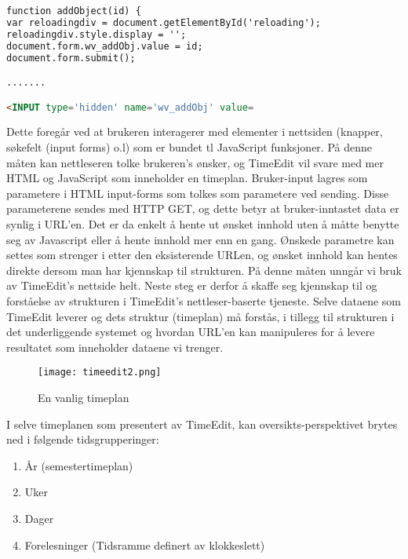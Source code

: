 \documentclass[../main.tex]{subfiles}
\begin{document}
\begin{lstlisting}[language=HTML, frame=single, caption={Utdraget av HTML kildekoden til TimeEdit ovenfor viser en JavaScript-funksjon og en input-tag.}]
function addObject(id) {
var reloadingdiv = document.getElementById('reloading');
reloadingdiv.style.display = '';
document.form.wv_addObj.value = id;
document.form.submit();

.......

<INPUT type='hidden' name='wv_addObj' value=
\end{lstlisting}

Dette foregår ved at brukeren interagerer med elementer i nettsiden (knapper, søkefelt (input forms) o.l) som er bundet tl JavaScript funksjoner. På denne måten kan nettleseren tolke brukeren's ønsker, og TimeEdit vil svare med mer HTML og JavaScript som inneholder en timeplan. Bruker-input lagres som parametere i HTML input-forms som tolkes som parametere ved sending. Disse parameterene sendes med HTTP GET, og dette betyr at bruker-inntastet data er synlig i URL'en. Det er da enkelt å hente ut ønsket innhold uten å måtte benytte seg av Javascript eller å hente innhold mer enn en gang. Ønskede parametre kan settes som strenger i etter den eksisterende URLen, og ønsket innhold kan hentes direkte dersom man har kjennskap til strukturen. På denne måten unngår vi bruk av TimeEdit's nettside helt. \newline
Neste steg er derfor å skaffe seg kjennskap til og forståelse av strukturen i TimeEdit's nettleser-baserte tjeneste. Selve dataene som TimeEdit leverer og dets struktur (timeplan) må forstås, i tillegg til strukturen i det underliggende systemet og hvordan URL'en kan manipuleres for å levere resultatet som inneholder dataene vi trenger.

\begin{figure}[H]
  \centering
  \texttt{[image: timeedit2.png]}
  \caption{En vanlig timeplan}
\end{figure}

I selve timeplanen som presentert av TimeEdit, kan oversikts-perspektivet brytes ned i følgende tidsgrupperinger:

\begin{enumerate}
\item År (semestertimeplan)
\item Uker
\item Dager
\item Forelesninger (Tidsramme definert av klokkeslett)
\end{enumerate}
\end{document}
